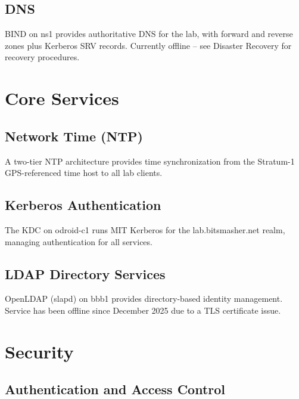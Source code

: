 % 


\section{DNS}
BIND on ns1 provides authoritative DNS for the lab, with forward and reverse zones plus Kerberos SRV records. Currently offline -- see Disaster Recovery for recovery procedures.

% 


\chapter{Core Services}

\section{Network Time (NTP)}
A two-tier NTP architecture provides time synchronization from the Stratum-1 GPS-referenced time host to all lab clients.

% 


\section{Kerberos Authentication}
The KDC on odroid-c1 runs MIT Kerberos for the lab.bitsmasher.net realm, managing authentication for all services.

% 


\section{LDAP Directory Services}
OpenLDAP (slapd) on bbb1 provides directory-based identity management. Service has been offline since December 2025 due to a TLS certificate issue.

% 


\chapter{Security}

\section{Authentication and Access Control}

